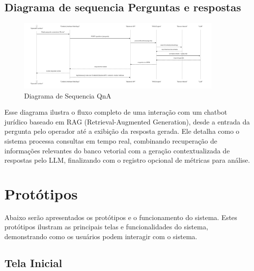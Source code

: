 \begin{description}
\subsection{Diagrama de sequencia Perguntas e respostas}
\begin{figure}[H]
  \centering
  \includegraphics[width=0.9\textwidth]{latex-overleaf/04-figuras/sequencia-pergunta.png}
  \caption{Diagrama de Sequencia QnA}
  \label{fig:QnA-Sequencia}
\end{figure}



Esse diagrama ilustra o fluxo completo de uma interação com um chatbot jurídico baseado em RAG (Retrieval-Augmented Generation), desde a entrada da pergunta pelo operador até a exibição da resposta gerada. Ele detalha como o sistema processa consultas em tempo real, combinando recuperação de informações relevantes do banco vetorial com a geração contextualizada de respostas pelo LLM, finalizando com o registro opcional de métricas para análise. 

\section{Protótipos}
\label{sec:prototipos}
\noindent Abaixo serão apresentados os protótipos e o funcionamento do sistema. Estes protótipos ilustram as principais telas e funcionalidades do sistema, demonstrando como os usuários podem interagir com o sistema.


\subsection{Tela Inicial}
\label{subsec:tela_inicial}


\end{description}
